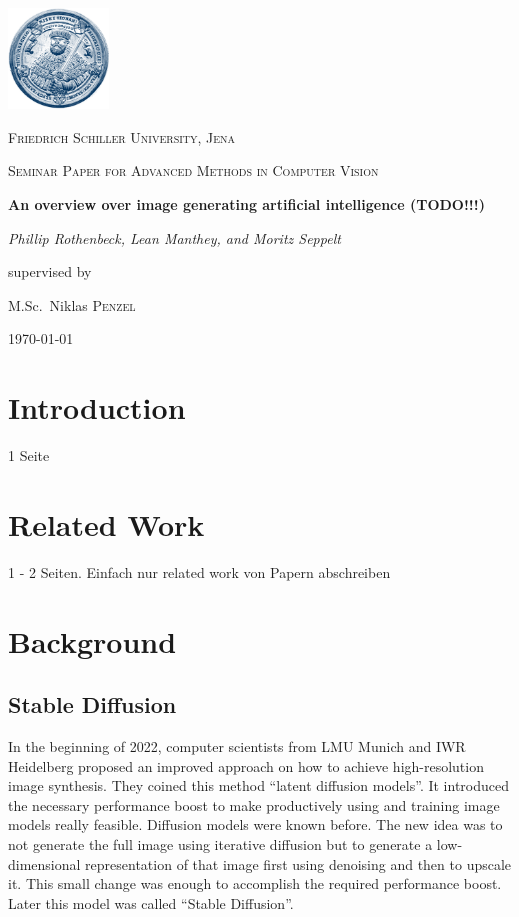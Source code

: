 \documentclass[11pt]{article}
\begin{document}
\begin{titlepage}
	\centering
	\includegraphics[width=0.2\textwidth]{assets/uni-logo.png}\par\vspace{0.5cm}
	{\scshape\LARGE Friedrich Schiller University, Jena \par}
	\vspace{1cm}
	{\scshape\Large Seminar Paper for Advanced Methods in Computer Vision\par}
	\vspace{1.5cm}
	{\huge\bfseries An overview over image generating artificial intelligence (TODO!!!)\par}
	\vspace{2cm}
	{\Large\itshape Phillip Rothenbeck, Lean Manthey, and Moritz Seppelt\par}
	\vfill
	supervised by\par
	M.Sc.~Niklas \textsc{Penzel}

	\vfill

	{\large \today\par}
\end{titlepage}

\tableofcontents
\newpage

\section{Introduction}
1 Seite

\section{Related Work}
1 - 2 Seiten. Einfach nur related work von Papern abschreiben
\section{Background}
\subsection{Stable Diffusion}
In the beginning of 2022, computer scientists from LMU Munich and IWR Heidelberg proposed an improved approach on how to achieve high-resolution image synthesis\cite{rombach2022stablediffusion}. They coined this method “latent diffusion models”. It introduced the necessary performance boost to make productively using and training image models really feasible. Diffusion models were known before. The new idea was to not generate the full image using iterative diffusion but to generate a low-dimensional representation of that image first using denoising and then to upscale it. This small change was enough to accomplish the required performance boost. Later this model was called “Stable Diffusion”.
\end{document}
